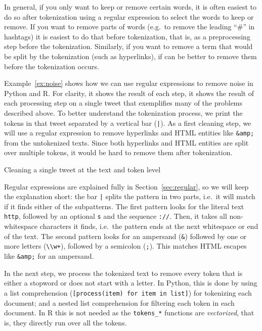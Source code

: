 In general, if you only want to keep or remove certain words, it is often easiest to do so after tokenization
using a regular expression to select the words to keep or remove.
If you want to remove parts of words (e.g.\ to remove the leading ``\#'' in hashtags) it is easiest to do that before tokenization,
that is, as a preprocessing step before the tokenization.
Similarly, if you want to remove a term that would be split by the tokenization (such as hyperlinks),
if can be better to remove them before the tokenization occurs.

Example~\ref{ex:noise} shows how we can use regular expressions to remove noise in Python and R.
For clarity, it shows the result of each step, it shows the result of each processing step on a single tweet that exemplifies many of the problems described above.
To better understand the tokenization process, we print the tokens in that tweet separated by a vertical bar (\verb+|+).
As a first cleaning step, we will use a regular expression to remove hyperlinks and HTML entities like \verb|&amp;| from the untokenized texts.
Since both hyperlinks and HTML entities are split over multiple tokens, it would be hard to remove them after tokenization.

\begin{ccsexample}
\caption{Cleaning a single tweet at the text and token level}\label{ex:noise}
\end{ccsexample}

Regular expressions are explained fully in Section~\ref{sec:regular}, so we will keep the explanation short:
the bar \verb+|+ splits the pattern in two parts, i.e.\ it will match if it finds either of the subpatterns.
The first pattern looks for the literal text \verb+http+, followed by an optional \verb+s+ and the sequence \verb+://+.
Then, it takes all non-whitespace characters it finds, i.e.\ the pattern ends at the next whitespace or end of the text.
The second pattern looks for an ampersand (\verb+&+) followed by one or more letters (\verb|\\w+|), followed by a semicolon (\verb+;+).
This matches HTML escapes like \verb+&amp;+ for an ampersand.

In the next step, we process the tokenized text to remove every token that is either a stopword or does not start with a letter.
In Python, this is done by using a list comprehension (\verb+[process(item) for item in list]+) for tokenizing each document; and a nested list comprehension for filtering each token in each document.
In R this is not needed as the \texttt{tokens\_*} functions are \emph{vectorized}, that is, they directly run over all the tokens.

